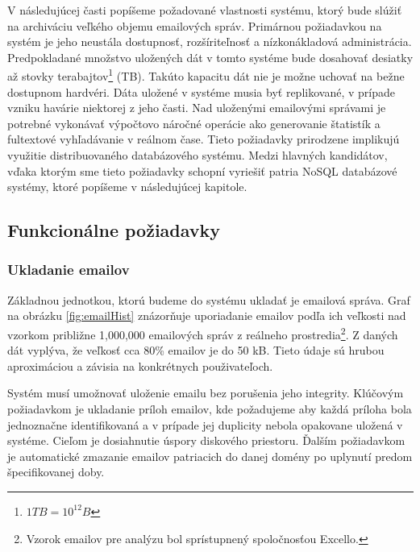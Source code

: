 \documentclass[11pt,twoside,a4paper]{book}
\begin{document}
V následujúcej časti popíšeme požadované vlastnosti systému, ktorý bude slúžiť na archiváciu veľkého objemu emailových správ. Primárnou požiadavkou na systém je jeho neustála dostupnosť, rozšíriteľnosť a nízkonákladová administrácia. Predpokladané množstvo uložených dát v tomto systéme bude dosahovať desiatky až stovky terabajtov\footnote{$1 TB = 10^{12} B$} (TB). Takúto kapacitu dát nie je možne uchovať na bežne dostupnom hardvéri. Dáta uložené v systéme musia byť replikované, v prípade vzniku havárie niektorej z jeho časti. Nad uloženými emailovými správami je potrebné vykonávať výpočtovo náročné operácie ako generovanie štatistík a fultextové vyhľadávanie v reálnom čase. Tieto požiadavky prirodzene implikujú využitie distribuovaného databázového systému. Medzi hlavných kandidátov, vďaka ktorým sme tieto požiadavky schopní vyriešiť patria NoSQL databázové systémy, ktoré popíšeme v následujúcej kapitole.


\subsection{Funkcionálne požiadavky}

\subsubsection*{Ukladanie emailov}
Základnou jednotkou, ktorú budeme do systému ukladať je emailová správa. Graf na obrázku \ref{fig:emailHist} znázorňuje uporiadanie emailov podľa ich veľkosti nad vzorkom približne 1,000,000 emailových správ z reálneho prostredia\footnote{Vzorok emailov pre analýzu bol sprístupnený spoločnosťou Excello.}. Z daných dát vyplýva, že veľkosť cca 80\% emailov je do 50 kB. Tieto údaje sú hrubou aproximáciou a závisia na konkrétnych použivateľoch.

Systém musí umožnovať uloženie emailu bez porušenia jeho integrity. Klúčovým požiadavkom je ukladanie príloh emailov, kde požadujeme aby každá príloha bola jednoznačne identifikovaná a v prípade jej duplicity nebola opakovane uložená v systéme. Cieľom je dosiahnutie úspory diskového priestoru. Ďalším požiadavkom je automatické zmazanie emailov patriacich do danej domény po uplynutí predom špecifikovanej doby.
\end{document}
